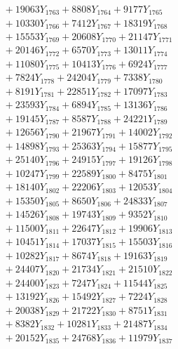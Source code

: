 \documentclass[a4paper,10pt]{article}
\begin{document}
{\begin{align}
&\;  + 19063 Y_{1763} + 8808 Y_{1764} + 9177 Y_{1765} \\[0.3ex]
&\;  + 10330 Y_{1766} + 7412 Y_{1767} + 18319 Y_{1768} \\[0.5ex]\allowbreak
&\;  + 15553 Y_{1769} + 20608 Y_{1770} + 21147 Y_{1771} \\[0.3ex]
&\;  + 20146 Y_{1772} + 6570 Y_{1773} + 13011 Y_{1774} \\[0.3ex]
&\;  + 11080 Y_{1775} + 10413 Y_{1776} + 6924 Y_{1777} \\[0.3ex]
&\;  + 7824 Y_{1778} + 24204 Y_{1779} + 7338 Y_{1780} \\[0.3ex]
&\;  + 8191 Y_{1781} + 22851 Y_{1782} + 17097 Y_{1783} \\[0.3ex]
&\;  + 23593 Y_{1784} + 6894 Y_{1785} + 13136 Y_{1786} \\[0.3ex]
&\;  + 19145 Y_{1787} + 8587 Y_{1788} + 24221 Y_{1789} \\[0.3ex]
&\;  + 12656 Y_{1790} + 21967 Y_{1791} + 14002 Y_{1792} \\[0.3ex]
&\;  + 14898 Y_{1793} + 25363 Y_{1794} + 15877 Y_{1795} \\[0.3ex]
&\;  + 25140 Y_{1796} + 24915 Y_{1797} + 19126 Y_{1798} \\[0.5ex]\allowbreak
&\;  + 10247 Y_{1799} + 22589 Y_{1800} + 8475 Y_{1801} \\[0.3ex]
&\;  + 18140 Y_{1802} + 22206 Y_{1803} + 12053 Y_{1804} \\[0.3ex]
&\;  + 15350 Y_{1805} + 8650 Y_{1806} + 24833 Y_{1807} \\[0.3ex]
&\;  + 14526 Y_{1808} + 19743 Y_{1809} + 9352 Y_{1810} \\[0.3ex]
&\;  + 11500 Y_{1811} + 22647 Y_{1812} + 19906 Y_{1813} \\[0.3ex]
&\;  + 10451 Y_{1814} + 17037 Y_{1815} + 15503 Y_{1816} \\[0.3ex]
&\;  + 10282 Y_{1817} + 8674 Y_{1818} + 19163 Y_{1819} \\[0.3ex]
&\;  + 24407 Y_{1820} + 21734 Y_{1821} + 21510 Y_{1822} \\[0.3ex]
&\;  + 24400 Y_{1823} + 7247 Y_{1824} + 11544 Y_{1825} \\[0.3ex]
&\;  + 13192 Y_{1826} + 15492 Y_{1827} + 7224 Y_{1828} \\[0.5ex]\allowbreak
&\;  + 20038 Y_{1829} + 21722 Y_{1830} + 8751 Y_{1831} \\[0.3ex]
&\;  + 8382 Y_{1832} + 10281 Y_{1833} + 21487 Y_{1834} \\[0.3ex]
&\;  + 20152 Y_{1835} + 24768 Y_{1836} + 11979 Y_{1837} \\[0.3ex]

\end{align}}
\end{document}

